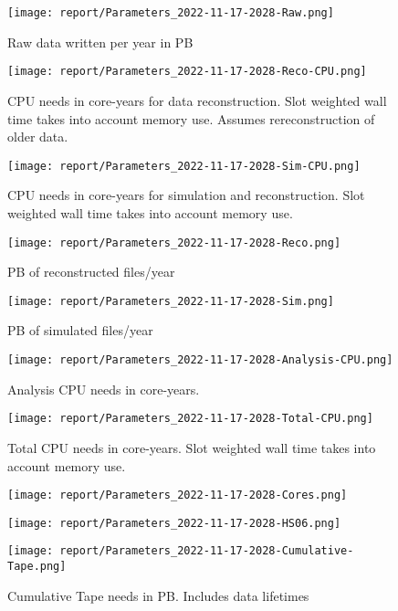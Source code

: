 \begin{figure}[ht]
\centering\texttt{[image: report/Parameters\_2022-11-17-2028-Raw.png]}\label{Raw}
\caption{Raw data written per year in PB}
\end{figure}
\begin{figure}[ht]
\centering\texttt{[image: report/Parameters\_2022-11-17-2028-Reco-CPU.png]}\label{Reco-CPU}
\caption{CPU needs in core-years for data reconstruction.              Slot weighted wall time takes into account memory use.  Assumes rereconstruction of older data.}
\end{figure}
\begin{figure}[ht]
\centering\texttt{[image: report/Parameters\_2022-11-17-2028-Sim-CPU.png]}\label{Sim-CPU}
\caption{CPU needs in core-years for simulation and reconstruction.              Slot weighted wall time takes into account memory use.}
\end{figure}
\begin{figure}[ht]
\centering\texttt{[image: report/Parameters\_2022-11-17-2028-Reco.png]}\label{Reco}
\caption{PB of reconstructed files/year}
\end{figure}
\begin{figure}[ht]
\centering\texttt{[image: report/Parameters\_2022-11-17-2028-Sim.png]}\label{Sim}
\caption{PB of simulated files/year}
\end{figure}
\begin{figure}[ht]
\centering\texttt{[image: report/Parameters\_2022-11-17-2028-Analysis-CPU.png]}\label{Analysis-CPU}
\caption{Analysis CPU needs in core-years.}
\end{figure}
\begin{figure}[ht]
\centering\texttt{[image: report/Parameters\_2022-11-17-2028-Total-CPU.png]}\label{Total-CPU}
\caption{Total CPU needs in core-years. Slot weighted wall time takes into account memory use.}
\end{figure}
\begin{figure}[ht]
\centering\texttt{[image: report/Parameters\_2022-11-17-2028-Cores.png]}\label{Cores}
\caption{}
\end{figure}
\begin{figure}[ht]
\centering\texttt{[image: report/Parameters\_2022-11-17-2028-HS06.png]}\label{HS06}
\caption{}
\end{figure}
\begin{figure}[ht]
\centering\texttt{[image: report/Parameters\_2022-11-17-2028-Cumulative-Tape.png]}\label{Cumulative-Tape}
\caption{Cumulative Tape needs in PB. Includes data lifetimes}
\end{figure}

